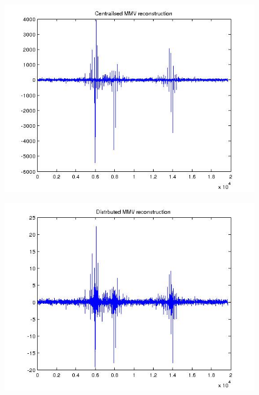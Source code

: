 \documentclass{article}
\begin{document}
\begin{figure}[h]
\centering
\includegraphics[height = 7.3 cm]{central_mmv.jpg}
\caption{ }
\label{central}
\end{figure}

\begin{figure}[h]
\centering
\includegraphics[height = 7.3 cm]{disrtrib_mmv.jpg}
\caption{ }
\label{distributed}
\end{figure}
\end{document}
